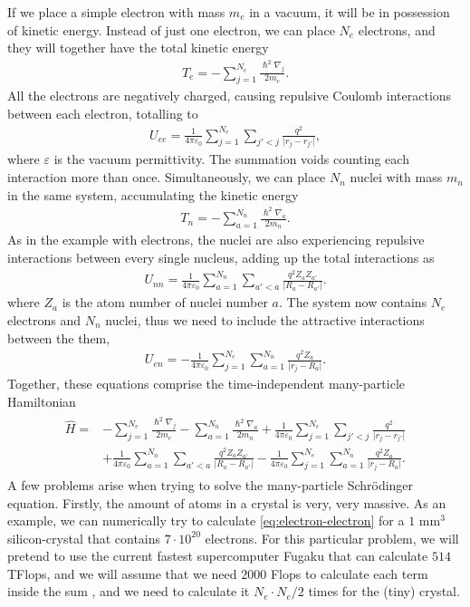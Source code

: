 If we place a simple electron with mass $m_e$ in a vacuum, it will be in  possession of kinetic energy. Instead of just one electron, we can place $N_e$ electrons, and they will together have the total kinetic energy
\begin{align}
  T_e = - \sum_{j=1}^{N_e} \frac{\hslash^2\nabla_j}{2m_e}.
\end{align}
All the electrons are negatively charged, causing repulsive Coulomb interactions between each electron, totalling to
\begin{align}
  U_{ee} = \frac{1}{4\pi\varepsilon_0}\sum_{j=1}^{N_e}\sum_{j'<j} \frac{q^2}{\lvert r_j - r_{j'}\rvert},
  \label{eq:electron-electron}
\end{align}
where $\varepsilon$ is the vacuum permittivity. The summation voids counting each interaction more than once. Simultaneously, we can place $N_n$ nuclei with mass $m_n$ in the same system, accumulating the kinetic energy
\begin{align}
  T_n = - \sum_{a=1}^{N_n} \frac{\hslash^2\nabla_a}{2m_n}.
\end{align}
As in the example with electrons, the nuclei are also experiencing repulsive interactions between every single nucleus, adding up the total interactions as
\begin{align}
  U_{nn} = \frac{1}{4\pi\varepsilon_0}\sum_{a=1}^{N_n}\sum_{a'<a} \frac{q^2 Z_aZ_{a'}}{\lvert R_a - R_{a'}\rvert }.
\end{align}
where $Z_a$ is the atom number of nuclei number $a$. The system now contains $N_e$ electrons and $N_n$ nuclei, thus we need to include the attractive interactions between the them,
\begin{align}
  U_{en} = - \frac{1}{4\pi\varepsilon_0}\sum_{j=1}^{N_e} \sum_{a=1}^{N_n} \frac{q^2Z_a}{\lvert r_j-R_a\rvert}.
\end{align} Together, these equations comprise the time-independent many-particle Hamiltonian
\begin{align}
  \begin{aligned}
    \hat{H} = &- \sum_{j=1}^{N_e} \frac{\hslash^2\nabla_j}{2m_e}
    - \sum_{a=1}^{N_n} \frac{\hslash^2\nabla_a}{2m_n}
    + \frac{1}{4\pi\varepsilon_0} \sum_{j=1}^{N_e}\sum_{j'<j} \frac{q^2}{\lvert r_j - r_{j'}\rvert} \\
    &+\frac{1}{4\pi\varepsilon_0}\sum_{a=1}^{N_n}\sum_{a'<a} \frac{q^2 Z_aZ_{a'}}{\lvert R_a - R_{a'}\rvert } - \frac{1}{4\pi\varepsilon_0}\sum_{j=1}^{N_e} \sum_{a=1}^{N_n} \frac{q^2Z_a}{\lvert r_j-R_a\rvert}.
  \end{aligned}
\end{align} A few problems arise when trying to solve the many-particle Schrödinger equation. Firstly, the amount of atoms in a crystal is very, very massive. As an example, we can numerically try to calculate \autoref{eq:electron-electron} for a $1$ mm$^3$ silicon-crystal that contains $7\cdot 10^{20}$ electrons. For this particular problem, we will pretend to use the current fastest supercomputer Fugaku \cite{Top500} that can calculate $514$ TFlops, and we will assume that we need $2000$ Flops to calculate each term inside the sum \cite{Persson2020}, and we need to calculate it $N_e \cdot N_e/2$ times for the (tiny) crystal.
